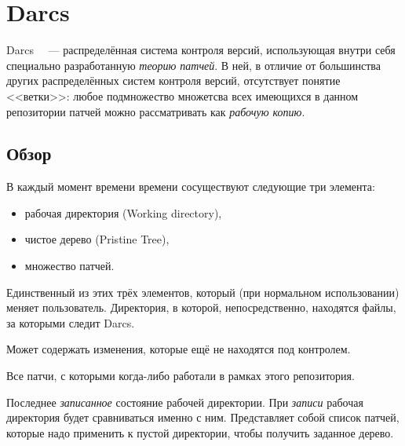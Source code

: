 
\section{Darcs}

Darcs~\cite{darcs} ~--- распределённая система контроля версий,
использующая внутри себя специально разработанную \emph{теорию
  патчей}. В ней, в отличие от большинства других распределённых
систем контроля версий, отсутствует понятие <<ветки>>: любое
подмножество множетсва всех имеющихся в данном репозитории патчей
можно рассматривать как \emph{рабочую копию}.

\subsection{Обзор}

В каждый момент времени времени сосуществуют следующие три
элемента: %

\begin{itemize}
\item рабочая директория (Working directory),
\item чистое дерево (Pristine Tree),
\item множество патчей.
\end{itemize}

\begin{definition}
  Единственный из этих трёх элементов, который (при нормальном
  использовании) меняет пользователь. Директория, в которой,
  непосредственно, находятся файлы, за которыми следит Darcs.

  Может содержать изменения, которые ещё не находятся под контролем.
\end{definition}

\begin{definition}
  Все патчи, с которыми когда-либо работали в рамках этого репозитория.
\end{definition}

\begin{definition}
  Последнее \emph{записанное} состояние рабочей директории. При
  \emph{записи} рабочая директория будет сравниваться именно с ним.
  Представляет собой список патчей, которые надо применить к пустой
  директории, чтобы получить заданное дерево.
\end{definition}

